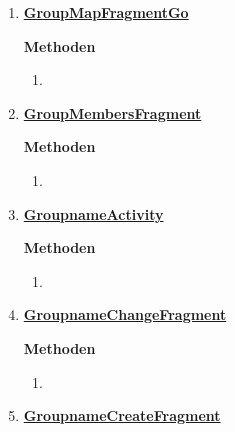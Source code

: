 \begin{enumerate}
\begin{enumerate}
	\end{enumerate}

	\item \textbf{\underline{GroupMapFragmentGo}}

	
	\textbf{Methoden}
	\begin{enumerate}
		\item[]
		
	\end{enumerate}

	\item \textbf{\underline{GroupMembersFragment}}
	
	
	\textbf{Methoden}
	\begin{enumerate}
		\item[]
		
	\end{enumerate}

	\item \textbf{\underline{GroupnameActivity}}
	
	
	\textbf{Methoden}
	\begin{enumerate}
		\item[]
		
	\end{enumerate}
	
	\item \textbf{\underline{GroupnameChangeFragment}}
	
	
	\textbf{Methoden}	
	\begin{enumerate}
		\item[]
		
	\end{enumerate}

	\item \textbf{\underline{GroupnameCreateFragment}}
	

\end{enumerate}
